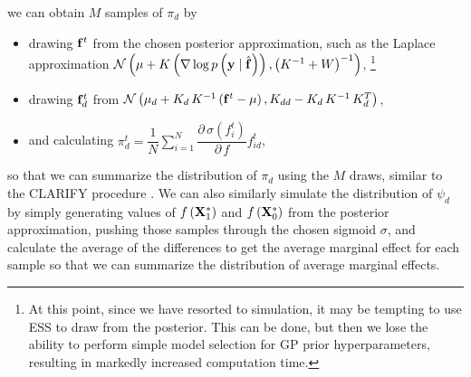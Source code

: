 \documentclass{draft}
\newcommand{\pd}{\ensuremath{\partial \,}}     %
\begin{document}
we can obtain \( M \) samples of \( \pi_d \) by

\begin{itemize}
    \item drawing \( \mathbf{f}^t \) from the chosen posterior approximation, such as the Laplace approximation
        \(
            \mathcal{N} \left(
                \mu + K \left( \nabla \log p \left( \mathbf{y} \mid \hat{\mathbf{f}} \right) \right), \left( K^{-1} + W \right)^{-1}
            \right)
        \),%
        \footnote{
            At this point, since we have resorted to simulation, it may be tempting to use ESS to draw from the posterior.
            This can be done, but then we lose the ability to perform simple model selection for GP prior hyperparameters,
            resulting in markedly increased computation time.
        }
    \item drawing \( \mathbf{f}^t_d \) from
        \(
            \mathcal{N} \left(
                \mu_d + K_d \, K^{-1} \left( \mathbf{f}^t - \mu \right), K_{dd} - K_{d} \, K^{-1} \, K_d^T
            \right)
        \),
    \item and calculating \( \pi_d^t = \dfrac{1}{N} \displaystyle\sum_{i=1}^N \dfrac{\pd \sigma \left( f_i^t \right)}{\pd f} f_{id}^t \),
\end{itemize}

so that we can summarize the distribution of \( \pi_d \) using the \( M \) draws,
similar to the CLARIFY procedure \citep{KingEtAl2000Making}.
We can also similarly simulate the distribution of \( \psi_d \)
by simply generating values of \( f \left( \mathbf{X}_1^\ast \right) \) and \( f \left( \mathbf{X}_0^\ast \right) \)
from the posterior approximation, pushing those samples through the chosen sigmoid \( \sigma \),
and calculate the average of the differences to get the average marginal effect for each sample
so that we can summarize the distribution of average marginal effects.
\end{document}
